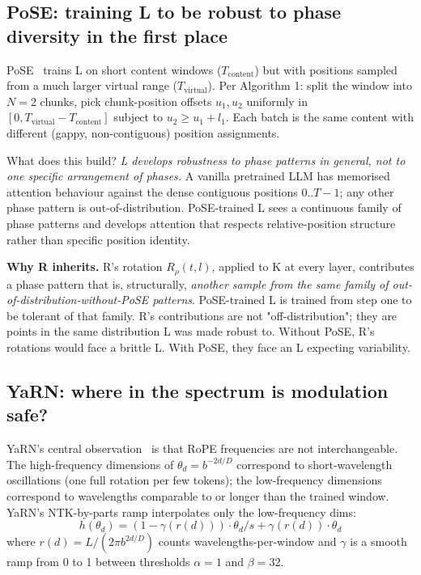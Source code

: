 \documentclass[10pt, twocolumn, a4paper]{article}
\begin{document}
\subsection*{PoSE: training L to be robust to phase diversity in the first place}

PoSE~\cite{zhu2024pose} trains L on short content windows ($T_{\text{content}}$) but with positions sampled from a much larger virtual range ($T_{\text{virtual}}$). Per Algorithm 1: split the window into $N=2$ chunks, pick chunk-position offsets $u_1, u_2$ uniformly in $[0, T_{\text{virtual}} - T_{\text{content}}]$ subject to $u_2 \ge u_1 + l_1$. Each batch is the same content with different (gappy, non-contiguous) position assignments.

What does this build? \emph{L develops robustness to phase patterns in general, not to one specific arrangement of phases.} A vanilla pretrained LLM has memorised attention behaviour against the dense contiguous positions $0..T-1$; any other phase pattern is out-of-distribution. PoSE-trained L sees a continuous family of phase patterns and develops attention that respects relative-position structure rather than specific position identity.

\textbf{Why R inherits.} R's rotation $R_\rho(t, l)$, applied to K at every layer, contributes a phase pattern that is, structurally, \emph{another sample from the same family of out-of-distribution-without-PoSE patterns}. PoSE-trained L is trained from step one to be tolerant of that family. R's contributions are not "off-distribution"; they are points in the same distribution L was made robust to. Without PoSE, R's rotations would face a brittle L. With PoSE, they face an L expecting variability.

\subsection*{YaRN: where in the spectrum is modulation safe?}

YaRN's central observation~\cite{peng2023yarn} is that RoPE frequencies are not interchangeable. The high-frequency dimensions of $\theta_d = b^{-2d/D}$ correspond to short-wavelength oscillations (one full rotation per few tokens); the low-frequency dimensions correspond to wavelengths comparable to or longer than the trained window. YaRN's NTK-by-parts ramp interpolates only the low-frequency dims:
\[
h(\theta_d) = (1 - \gamma(r(d))) \cdot \theta_d / s + \gamma(r(d)) \cdot \theta_d
\]
where $r(d) = L / (2\pi b^{2d/D})$ counts wavelengths-per-window and $\gamma$ is a smooth ramp from 0 to 1 between thresholds $\alpha=1$ and $\beta=32$.
\end{document}
